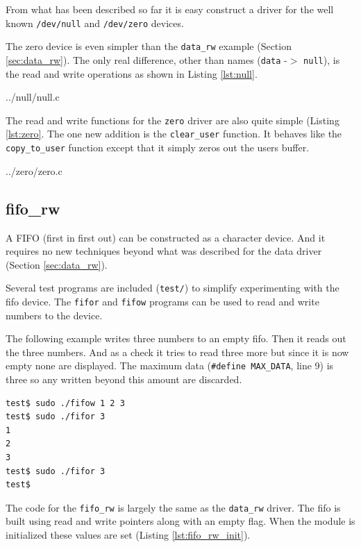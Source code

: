 \documentclass{article}
\begin{document}
From what has been described so far it is easy construct a driver
for the well known \verb+/dev/null+ and \verb+/dev/zero+ devices.

The zero device is even simpler than the \verb+data_rw+ example
(Section \ref{sec:data_rw}).
The only real difference, other than names (\verb+data+ -$>$ \verb+null+),
is the read and write operations as shown in Listing \ref{lst:null}.


	{../null/null.c}

The read and write functions for the \verb+zero+ driver are also quite
simple (Listing \ref{lst:zero}.
The one new addition is the \verb+clear_user+ function.
It behaves like the \verb+copy_to_user+ function except that it simply
zeros out the users buffer.


	{../zero/zero.c}


\subsection{fifo\_rw}
\label{sec:fifo_rw}

A FIFO (first in first out) can be constructed as a character device.
And it requires no new techniques beyond what was described for
the data driver (Section \ref{sec:data_rw}).

Several test programs are included (\verb+test/+) to simplify
experimenting with the fifo device.
The \verb+fifor+ and \verb+fifow+ programs can
be used to read and write numbers to the device.

The following example writes three numbers to an empty fifo.
Then it reads out the three numbers.  And as a check it tries
to read three more but since it is now empty none are displayed.
The maximum data (\verb+#define MAX_DATA+, line 9) is three so
any written beyond this amount are discarded.

\begin{verbatim}
test$ sudo ./fifow 1 2 3
test$ sudo ./fifor 3
1
2
3
test$ sudo ./fifor 3
test$
\end{verbatim}

The code for the \verb+fifo_rw+ is largely the same as the \verb+data_rw+
driver.
The fifo is built using read and write pointers along with an empty flag.
When the module is initialized these values are
set (Listing \ref{lst:fifo_rw_init}).
\end{document}
